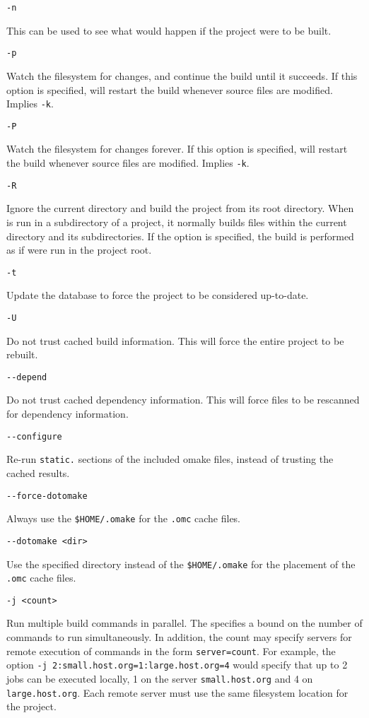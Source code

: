  \verb+-n+

This can be used to see what would happen if the project were to be built.

 \verb+-p+

Watch the filesystem for changes, and continue the build until it succeeds.  If this
option is specified,  will restart the build whenever source files are modified. Implies
\texttt{-k}.

 \verb+-P+

Watch the filesystem for changes forever.  If this option is specified, 
will restart the build whenever source files are modified. Implies
\texttt{-k}.

 \verb+-R+

Ignore the current directory and build the project from its root directory.  When
 is run in a subdirectory of a project, it normally builds files within the current
directory and its subdirectories.  If the  option is specified, the build is performed as if
 were run in the project root.

 \verb+-t+

Update the  database to force the project to be considered up-to-date.

 \verb+-U+

Do not trust cached build information.  This will force the entire project to be rebuilt.

 \verb+--depend+

Do not trust cached dependency information.  This will force files to be rescanned
for dependency information.

 \verb+--configure+

Re-run \verb+static.+ sections of the included omake files, instead of
trusting the cached results.

 \verb+--force-dotomake+

Always use the \verb+$HOME/.omake+ for the \verb+.omc+ cache files.

 \verb+--dotomake <dir>+

Use the specified directory instead of the \verb+$HOME/.omake+
for the placement of the \verb+.omc+ cache files.

 \verb+-j <count>+

Run multiple build commands in parallel.  The  specifies a
bound on the number of commands to run simultaneously.  In addition, the count may specify servers
for remote execution of commands in the form \verb+server=count+.  For example, the option
\verb+-j 2:small.host.org=1:large.host.org=4+ would specify that up to 2 jobs can be executed
locally, 1 on the server \verb+small.host.org+ and 4 on \verb+large.host.org+.  Each remote server
must use the same filesystem location for the project.

